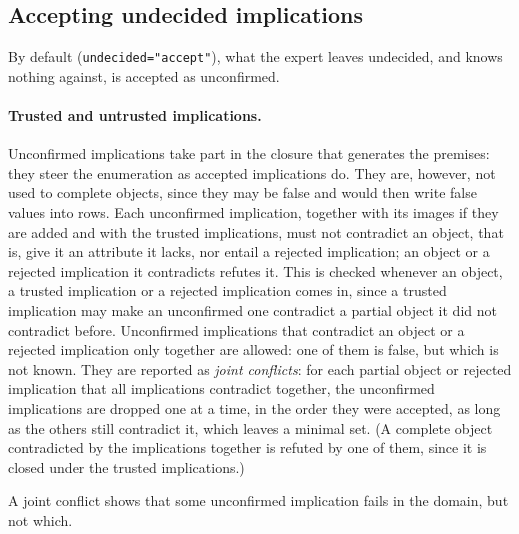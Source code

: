 \documentclass[11pt,a4paper]{article}
\theoremstyle{definition}
\theoremstyle{remark}
\newcommand{\code}[1]{\texttt{#1}}
\begin{document}
\subsection{Accepting undecided implications}\label{sec:accept}

By default (\code{undecided="accept"}), what the expert leaves undecided, and knows nothing against, is accepted as unconfirmed.

\paragraph{Trusted and untrusted implications.}
Unconfirmed implications take part in the closure that generates the premises: they steer the enumeration as accepted implications do. They are, however, not used to complete objects, since they may be false and would then write false values into rows. Each unconfirmed implication, together with its images if they are added and with the trusted implications, must not contradict an object, that is, give it an attribute it lacks, nor entail a rejected implication; an object or a rejected implication it contradicts refutes it. This is checked whenever an object, a trusted implication or a rejected implication comes in, since a trusted implication may make an unconfirmed one contradict a partial object it did not contradict before. Unconfirmed implications that contradict an object or a rejected implication only together are allowed: one of them is false, but which is not known. They are reported as \emph{joint conflicts}: for each partial object or rejected implication that all implications contradict together, the unconfirmed implications are dropped one at a time, in the order they were accepted, as long as the others still contradict it, which leaves a minimal set. (A complete object contradicted by the implications together is refuted by one of them, since it is closed under the trusted implications.)

A joint conflict shows that some unconfirmed implication fails in the domain, but not which.
\end{document}
